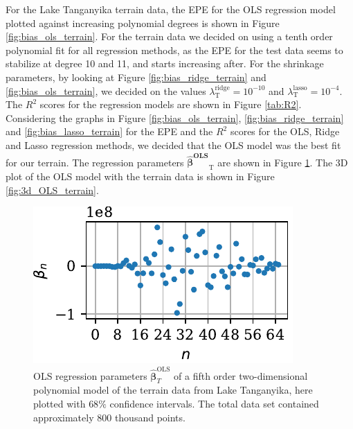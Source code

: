 \documentclass[a4paper, 10pt]{article}
\begin{document}
\begin{multicols}{2}
\noindent
For the Lake Tanganyika  terrain data, the EPE for the OLS regression model plotted against increasing polynomial degrees is shown in Figure \ref{fig:bias_ols_terrain}. For the terrain data we decided on using a tenth order polynomial fit for all regression methods, as the EPE for the test data seems to stabilize at degree 10 and 11, and starts increasing after.  For the shrinkage parameters, by looking at Figure \ref{fig:bias_ridge_terrain} and \ref{fig:bias_ols_terrain}, we decided on the values  $\lambda^\text{ridge}_\text{T}=10^{-10} $ and $\lambda^\text{lasso}_\text{T}=10^{-4} $.
The $R^2$ scores for the regression models  are shown in Figure \ref{tab:R2}. Considering the graphs in Figure \ref{fig:bias_ols_terrain}, \ref{fig:bias_ridge_terrain} and \ref{fig:bias_lasso_terrain} for the EPE  and the $R^2$ scores for the OLS, Ridge and Lasso regression methods, we decided that the OLS model was the best fit for our terrain.  The regression parameters $\bm{\hat{\beta}^\text{OLS}}_\text{T}$ are shown in Figure \ref{fig:beta_variance_terrain}. The 3D plot of the OLS model with the terrain data is shown in Figure \ref{fig:3d_OLS_terrain}.

\begin{figure}[H]
    \includegraphics[scale=1]{figs/beta_variance_ols_terrain.pdf}
    \caption{OLS regression parameters $\bm{\hat{\beta}}^{\text{OLS}}_T$  of a fifth order two-dimensional polynomial model  of the terrain data from Lake Tanganyika, here plotted with $68\%$ confidence intervals. The total data set contained approximately 800 thousand points.}
    \label{fig:beta_variance_terrain}
\end{figure}

\end{multicols}
\end{document}
